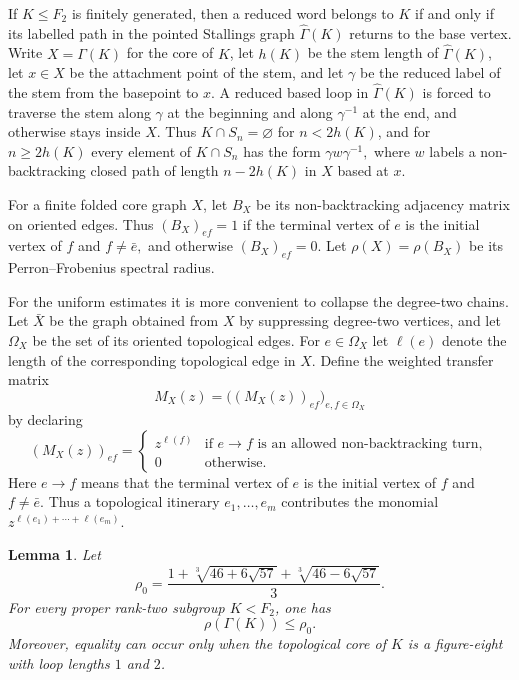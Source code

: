 \documentclass{amsproc}
\newtheorem{lemma}[theorem]{Lemma}
\begin{document}
If $K\leq F_2$ is finitely generated, then a reduced word belongs to $K$ if and
only if its labelled path in the pointed Stallings graph
$\widehat\Gamma(K)$ returns to the base vertex.  Write $X=\Gamma(K)$ for the
core of $K$, let $h(K)$ be the stem length of $\widehat\Gamma(K)$, let
$x\in X$ be the attachment point of the stem, and let $\gamma$ be the reduced
label of the stem from the basepoint to $x$.  A reduced based loop in
$\widehat\Gamma(K)$ is forced to traverse the stem along $\gamma$ at the
beginning and along $\gamma^{-1}$ at the end, and otherwise stays inside $X$.
Thus $K\cap S_n=\varnothing$ for $n<2h(K)$, and for $n\geq 2h(K)$ every element
of $K\cap S_n$ has the form
$
        \gamma w\gamma^{-1},
$
where $w$ labels a non-backtracking closed path of length $n-2h(K)$ in $X$
based at $x$.

For a finite folded core graph $X$, let $B_X$ be its non-backtracking adjacency
matrix on oriented edges.  Thus
$
        (B_X)_{ef}=1
$
if the terminal vertex of $e$ is the initial vertex of $f$ and
$
        f\neq \bar e,
$
and otherwise
$
        (B_X)_{ef}=0.
$
Let
$
        \rho(X)=\rho(B_X)
$
be its Perron--Frobenius spectral radius.

For the uniform estimates it is more convenient to collapse the degree-two
chains.  Let
$
        \bar X
$
be the graph obtained from $X$ by suppressing degree-two vertices, and let
$\Omega_X$ be the set of its oriented topological edges.  For
$
        e\in \Omega_X
$
let $\ell(e)$ denote the length of the corresponding topological edge in $X$.
Define the weighted transfer matrix
\[
        M_X(z)=\bigl((M_X(z))_{ef}\bigr)_{e,f\in \Omega_X}
\]
by declaring
\[
        (M_X(z))_{ef}=
        \begin{cases}
                z^{\ell(f)} & \text{if }e\to f\text{ is an allowed non-backtracking turn},\\
                0 & \text{otherwise.}
        \end{cases}
\]
Here
$
        e\to f
$
means that the terminal vertex of $e$ is the initial vertex of $f$ and
$
        f\neq \bar e.
$
Thus a topological itinerary
$
        e_1,\dots,e_m
$
contributes the monomial
$
        z^{\ell(e_1)+\cdots+\ell(e_m)}.
$

\begin{lemma}\label{L.sharp-cogrowth}
Let
\[
        \rho_0=
        \frac{1+\sqrt[3]{46+6\sqrt{57}}+\sqrt[3]{46-6\sqrt{57}}}{3}.
\]
For every proper rank-two subgroup $K<F_2$, one has
\[
        \rho(\Gamma(K))\leq \rho_0.
\]
Moreover, equality can occur only when the topological core of $K$ is a
figure-eight with loop lengths $1$ and $2$.
\end{lemma}
\end{document}
